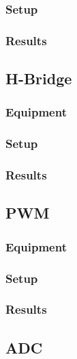 \subsubsection{Setup}

\subsubsection{Results}

\subsection{H-Bridge}

\subsubsection{Equipment}

\subsubsection{Setup}

\subsubsection{Results}

\subsection{PWM}

\subsubsection{Equipment}

\subsubsection{Setup}

\subsubsection{Results}

\subsection{ADC}

